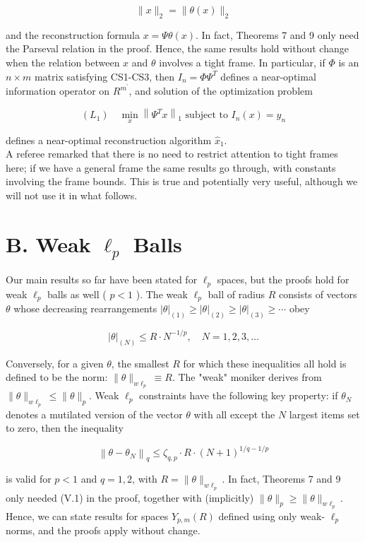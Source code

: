 \documentclass[10pt]{article}
\begin{document}
$$
\|x\|_{2}=\|\theta(x)\|_{2}
$$

and the reconstruction formula $x=\Psi \theta(x)$. In fact, Theorems 7 and 9 only need the Parseval relation in the proof. Hence, the same results hold without change when the relation between $x$ and $\theta$ involves a tight frame. In particular, if $\Phi$ is an $n \times m$ matrix satisfying CS1-CS3, then $I_{n}=\Phi \Psi^{T}$ defines a near-optimal information operator on $R^{m^{\prime}}$, and solution of the optimization problem

$$
\left(L_{1}\right) \quad \min _{x}\left\|\Psi^{T} x\right\|_{1} \text { subject to } I_{n}(x)=y_{n}
$$

defines a near-optimal reconstruction algorithm $\hat{x}_{1}$.\\
A referee remarked that there is no need to restrict attention to tight frames here; if we have a general frame the same results go through, with constants involving the frame bounds. This is true and potentially very useful, although we will not use it in what follows.

\section*{B. Weak $\ell_{p}$ Balls}
Our main results so far have been stated for $\ell_{p}$ spaces, but the proofs hold for weak $\ell_{p}$ balls as well ( $p<1$ ). The weak $\ell_{p}$ ball of radius $R$ consists of vectors $\theta$ whose decreasing rearrangements $|\theta|_{(1)} \geq|\theta|_{(2)} \geq|\theta|_{(3)} \geq \cdots$ obey

$$
|\theta|_{(N)} \leq R \cdot N^{-1 / p}, \quad N=1,2,3, \ldots
$$

Conversely, for a given $\theta$, the smallest $R$ for which these inequalities all hold is defined to be the norm: $\|\theta\|_{w \ell_{p}} \equiv R$. The "weak" moniker derives from $\|\theta\|_{w \ell_{p}} \leq\|\theta\|_{p}$. Weak $\ell_{p}$ constraints have the following key property: if $\theta_{N}$ denotes a mutilated version of the vector $\theta$ with all except the $N$ largest items set to zero, then the inequality


\begin{equation*}
\left\|\theta-\theta_{N}\right\|_{q} \leq \zeta_{q, p} \cdot R \cdot(N+1)^{1 / q-1 / p} \tag{V.1}
\end{equation*}


is valid for $p<1$ and $q=1,2$, with $R=\|\theta\|_{w \ell_{p}}$. In fact, Theorems 7 and 9 only needed (V.1) in the proof, together with (implicitly) $\|\theta\|_{p} \geq\|\theta\|_{w \ell_{p}}$. Hence, we can state results for spaces $Y_{p, m}(R)$ defined using only weak- $\ell_{p}$ norms, and the proofs apply without change.
\end{document}

